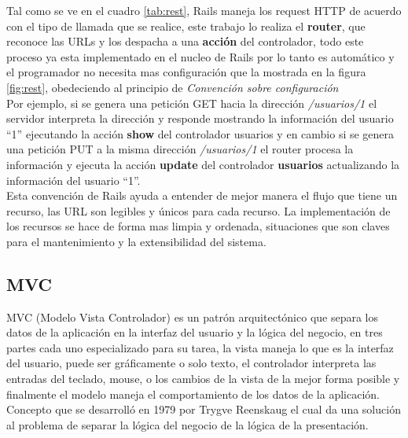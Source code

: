       Tal como se ve en el cuadro \ref{tab:rest}, Rails maneja los request HTTP de acuerdo con
      el tipo de llamada que se realice, este trabajo lo realiza el \textbf{router},    
      que reconoce las URLs y los despacha a una \textbf{acci\'on} del controlador,
      todo este proceso ya esta implementado en el nucleo de Rails por lo tanto  es autom\'atico y el programador
      no necesita mas configuraci\'on que la mostrada en la figura \ref{fig:rest}, 
      obedeciendo al principio de \emph{Convención sobre configuración}\\
 


      Por ejemplo, si se genera una petición GET hacia la direcci\'on  
      \mbox{\emph{/usuarios/1}}  el servidor interpreta la dirección y responde 
      mostrando la información del usuario “1” ejecutando la acción 
      \textbf{show} del controlador usuarios y en cambio si se genera 
      una petición PUT a la misma direcci\'on \emph{/usuarios/1} el router 
      procesa la información y ejecuta la acción \textbf{update} del controlador 
      \textbf{usuarios} actualizando la información del usuario “1”. \\

      Esta convención de Rails ayuda a entender de mejor manera el flujo que tiene un recurso, 
      las URL son legibles y únicos para cada recurso. La implementación 
      de los recursos se hace de forma mas limpia y ordenada, situaciones que son 
      claves para el mantenimiento y la extensibilidad del sistema.



    \subsection{MVC} %
    \label{sub:mvc}
      MVC (Modelo Vista  Controlador) es un patrón arquitectónico que separa 
      los datos de la aplicación en la interfaz del usuario y  la lógica del 
      negocio, en tres partes cada uno especializado para su tarea, la vista 
      maneja lo que es la interfaz del usuario, puede ser gráficamente o solo texto, 
      el controlador interpreta las entradas del teclado, mouse, o los cambios 
      de la vista de la mejor forma posible y finalmente el modelo maneja el comportamiento 
      de los datos de la aplicación.\cite{web7}
      Concepto que se desarrolló en 1979 por Trygve Reenskaug el cual da una 
      solución al problema de separar la lógica del negocio de la lógica de la presentación.\\ 
     
